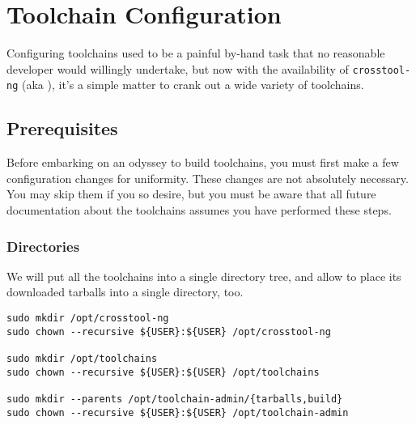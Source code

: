 %
%
%
%
\chapter{Toolchain Configuration}\label{chap:toolchain-configuration}

Configuring toolchains used to be a painful by-hand task that no
reasonable developer would willingly undertake, but now with the
availability of \texttt{crosstool-ng} (aka \ctng), it's a simple matter
to crank out a wide variety of toolchains.

\section{Prerequisites}

Before embarking on an odyssey to build toolchains, you must first
make a few configuration changes for uniformity.  These changes are
not absolutely necessary.  You may skip them if you so desire, but you
must be aware that all future documentation about the toolchains
assumes you have performed these steps.

\subsection{Directories}
We will put all the toolchains into a single directory tree, and
allow \ctng to place its downloaded tarballs into a single
directory, too.

\begin{footnotesize}
\begin{verbatim}
sudo mkdir /opt/crosstool-ng
sudo chown --recursive ${USER}:${USER} /opt/crosstool-ng

sudo mkdir /opt/toolchains
sudo chown --recursive ${USER}:${USER} /opt/toolchains

sudo mkdir --parents /opt/toolchain-admin/{tarballs,build}
sudo chown --recursive ${USER}:${USER} /opt/toolchain-admin
\end{verbatim}
\end{footnotesize}

